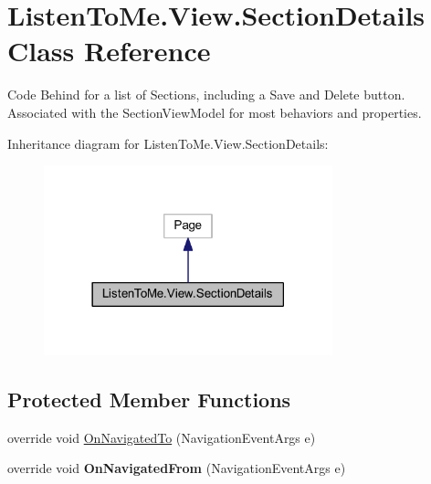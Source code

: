 \hypertarget{class_listen_to_me_1_1_view_1_1_section_details}{}\section{Listen\+To\+Me.\+View.\+Section\+Details Class Reference}
\label{class_listen_to_me_1_1_view_1_1_section_details}


Code Behind for a list of Sections, including a Save and Delete button. Associated with the Section\+View\+Model for most behaviors and properties.  




Inheritance diagram for Listen\+To\+Me.\+View.\+Section\+Details\+:\nopagebreak
\begin{figure}[H]
\begin{center}
\leavevmode
\includegraphics[width=237pt]{class_listen_to_me_1_1_view_1_1_section_details__inherit__graph}
\end{center}
\end{figure}
\subsection*{Protected Member Functions}
\begin{DoxyCompactItemize}
\item 
override void \hyperlink{class_listen_to_me_1_1_view_1_1_section_details_a2d1f58db622fbfddf4b848c9194436ae}{On\+Navigated\+To} (Navigation\+Event\+Args e)
\item 
override void {\bfseries On\+Navigated\+From} (Navigation\+Event\+Args e)\hypertarget{class_listen_to_me_1_1_view_1_1_section_details_ae3088d35563a02d86cc338be20ba56a3}{}\label{class_listen_to_me_1_1_view_1_1_section_details_ae3088d35563a02d86cc338be20ba56a3}

\end{DoxyCompactItemize}
